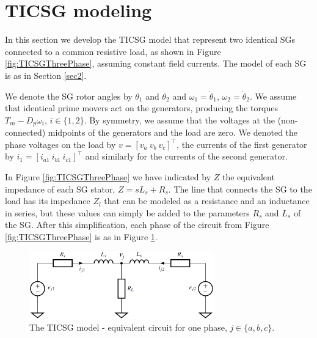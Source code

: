 \documentclass[letterpaper,10pt,conference]{ieeeconf}
\renewcommand{\o}    {{\omega}}
\begin{document}
\section{TICSG modeling} \label{sec3} %

In this section we develop the TICSG model that represent two 
identical SGs connected to a common resistive load, as shown in
Figure \ref{fig:TICSGThreePhase}, assuming constant field currents.
The model of each SG is as in Section \ref{sec2}.

We denote the SG rotor angles by $\theta_1$ and $\theta_2$ and
$\o_1=\dot\theta_1$, $\o_2=\dot\theta_2$. We assume that identical
prime movers act on the generators, producing the torques
$T_{m}-D_p\o_i$, $i\in\{1,2\}$. By symmetry, we assume that the
voltages at the (non-connected) midpoints of the generators and the
load are zero. We denoted the phase voltages on the load by
$v=\left[v_a\ v_b\ v_c \right]^\top$, the currents of the first
generator by $i_1=\left[i_{a1} \ i_{b1}\ i_{c1}\right]^\top$ and 
similarly for the currents of the second generator.

In Figure \ref{fig:TICSGThreePhase} we have indicated by $Z$ the
equivalent impedance of each SG stator, $Z=sL_s+R_s$. The line that
connects the SG to the load has its impedance $Z_l$ that can be
modeled as a resistance and an inductance in series, but these values
can simply be added to the parameters $R_s$ and $L_s$ of the SG. After
this simplification, each phase of the circuit from Figure
\ref{fig:TICSGThreePhase} is as in Figure \ref{fig:TICSGOnePhase}.

\begin{figure} %
\centering \includegraphics[width=8cm]{one_phase.eps}
\vspace{-3mm}
\caption{The TICSG model - equivalent circuit for one phase, 
$j\in\{a,b,c\}.$} \vspace{-6mm}
\label{fig:TICSGOnePhase}
\end{figure}
\end{document}
